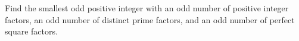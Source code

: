 Find the smallest odd positive integer with an odd number of positive integer factors, an odd number of distinct prime factors, and an odd number of perfect square factors.
